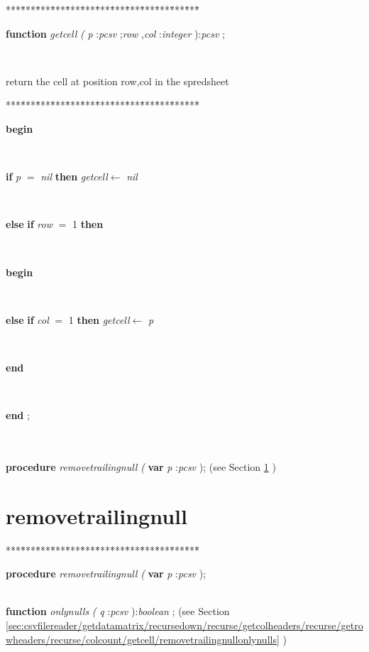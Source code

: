 \begin{tabbing}
***\=***\=***\=***\=***\=***\=***\=***\=***\=***\=***\=***\=***\=\kill
\parbox{14cm}{\textsf{\textbf{function}  \textit{getcell} \textit{(} \textit{p} :\textit{pcsv} ;\textit{row} ,\textit{col} :\textit{integer} ):\textit{pcsv} ;}}\\
\end{tabbing}
return the cell at position row,col in the spredsheet
\begin{tabbing}
***\=***\=***\=***\=***\=***\=***\=***\=***\=***\=***\=***\=***\=\kill
\\
\+\parbox{14cm}{\textsf{\textbf{begin} }}\\
\+\parbox{14cm}{\textsf {\textbf {if } \textsf{\textit{p} $=$ \textit{nil}} \textbf{ then } \textsf{\textit{getcell}$\leftarrow$ \textit{nil}}}}\\
\<\-\+\parbox{14cm}{\textsf {\textbf {else }  \textbf{ if } \textsf{\textit{row} $=$ 1} \textbf{ then } }}\\
\<\parbox{14cm}{\textsf{\textbf{begin} }}\\
\+\parbox{14cm}{\textsf {\textbf {else }  \textbf{ if } \textsf{\textit{col} $=$ 1} \textbf{ then } \textsf{\textit{getcell}$\leftarrow$ \textit{p}}}}\\
\<\-\<\-\parbox{14cm}{\textsf{\textbf{end} }}\\
\<\-\parbox{14cm}{\textsf{\textbf{end} ;}}\\
\\
\+\textsf{\textbf{procedure}  \textit{removetrailingnull} \textit{(}  \textbf{var}  \textit{p} :\textit{pcsv} );} (see Section \ref{sec:csvfilereader/getdatamatrix/recursedown/recurse/getcolheaders/recurse/getrowheaders/recurse/colcount/getcellremovetrailingnull} )\\
\end{tabbing}
\section{removetrailingnull}\label{sec:csvfilereader/getdatamatrix/recursedown/recurse/getcolheaders/recurse/getrowheaders/recurse/colcount/getcellremovetrailingnull}

\begin{tabbing}
***\=***\=***\=***\=***\=***\=***\=***\=***\=***\=***\=***\=***\=\kill
\parbox{14cm}{\textsf{\textbf{procedure}  \textit{removetrailingnull} \textit{(}  \textbf{var}  \textit{p} :\textit{pcsv} );}}\\
\+\textsf{\textbf{function}  \textit{onlynulls} \textit{(} \textit{q} :\textit{pcsv} ):\textit{boolean} ;} (see Section \ref{sec:csvfilereader/getdatamatrix/recursedown/recurse/getcolheaders/recurse/getrowheaders/recurse/colcount/getcell/removetrailingnullonlynulls} )\\
\end{tabbing}
